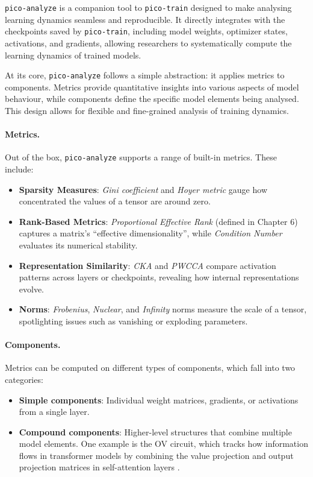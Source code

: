 \texttt{pico-analyze} is a companion tool to \texttt{pico-train} designed to make analysing learning dynamics seamless and reproducible. It directly integrates with the checkpoints saved by \texttt{pico-train}, including model weights, optimizer states, activations, and gradients, allowing researchers to systematically compute the learning dynamics of trained models.

At its core, \texttt{pico-analyze} follows a simple abstraction: it applies metrics to components. Metrics provide quantitative insights into various aspects of model behaviour, while components define the specific model elements being analysed. This design allows for flexible and fine-grained analysis of training dynamics. 

\paragraph{Metrics.} Out of the box, \texttt{pico-analyze} supports a range of built-in metrics. These include:
\begin{itemize}
    \item \textbf{Sparsity Measures}: \textit{Gini coefficient} \citep{hurley2009gini} and \textit{Hoyer metric} \citep{hoyer2004sparsity} gauge how concentrated the values of a tensor are around zero.

    \item \textbf{Rank-Based Metrics}: \textit{Proportional Effective Rank} (defined in Chapter 6) captures a matrix's “effective dimensionality”, while \textit{Condition Number} evaluates its numerical stability.

    \item \textbf{Representation Similarity}: \textit{CKA} \citep{kornblith2019cka} and \textit{PWCCA} \citep{morcos2018pwcca} compare activation patterns across layers or checkpoints, revealing how internal representations evolve.
    
    \item \textbf{Norms}: \textit{Frobenius}, \textit{Nuclear}, and \textit{Infinity} norms measure the scale of a tensor, spotlighting issues such as vanishing or exploding parameters.
\end{itemize}

\paragraph{Components.} Metrics can be computed on different types of components, which fall into two categories: 
\begin{itemize} 
\item \textbf{Simple components}: Individual weight matrices, gradients, or activations from a single layer. 
\item \textbf{Compound components}: Higher-level structures that combine multiple model elements. One example is the OV circuit, which tracks how information flows in transformer models by combining the value projection and output projection matrices in self-attention layers \cite{elhage2021mathematical}. 
\end{itemize}

